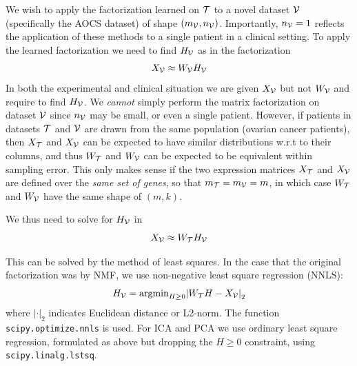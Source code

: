 \documentclass[tikz, 12pt,a4paper,oneside,fleqn]{article}
\begin{document}
We wish to apply the factorization learned on $\mathcal{T}$ to a novel dataset $\mathcal{V}$ (specifically the AOCS dataset) of shape $(m_{\mathcal{V}}, n_{\mathcal{V}})$. 
Importantly, $n_{\mathcal{V}} = 1$ reflects the application of these methods to a single patient in a clinical setting.  To apply the learned factorization we need to find $H_{\mathcal{V}}$ as in the factorization
\begin{equation}
	X_{\mathcal{V}} \approx W_{\mathcal{V}} H_{\mathcal{V}}
\end{equation}
In both the experimental and clinical situation we are given $X_{\mathcal{V}}$ but not $W_{\mathcal{V}}$ and require to find $H_{\mathcal{V}}$. 
We \emph{cannot} simply perform the matrix factorization on dataset $\mathcal{V}$ since $n_{\mathcal{V}}$ may be small, or even a single patient.   
However, if patients in datasets $\mathcal{T}$ and $\mathcal{V}$ are drawn from the same population (ovarian cancer patients), then $X_{\mathcal{T}}$ and $X_{\mathcal{V}}$ can be expected to have similar distributions w.r.t to their columns, and thus $W_{\mathcal{T}}$ and $W_{\mathcal{V}}$ can be expected to be equivalent within sampling error.  
This only makes sense if the two expression matrices $X_{\mathcal{T}}$ and $X_{\mathcal{V}}$ are defined over the \emph{same set of genes}, so that $m_{\mathcal{T}} = m_{\mathcal{V}} = m$, in which case $W_{\mathcal{T}}$ and $W_{\mathcal{V}}$ have the same shape of $(m, k)$.   

We thus need to solve for $H_{\mathcal{V}}$ in
\begin{equation}
	X_{\mathcal{V}}  \approx  W_{\mathcal{T}} H_{\mathcal{V}} \label{eq_Xv_WtHv}
\end{equation}

This can be solved by the method of least squares.  In the case that the original factorization was by NMF, we use non-negative least square regression (NNLS):
\begin{equation}
	H_{\mathcal{V}} = \mbox{argmin}_{H\geq 0}{\lvert W_{\mathcal{T}} H - X_{\mathcal{V}} \rvert}_2
	\label{eq_Hv_WdtXv}
\end{equation}
where ${\lvert \mathbf{\cdot} \rvert}_2$ indicates Euclidean distance or L2-norm.
The function {\tt scipy.optimize.nnls} is used.
For ICA and PCA we use ordinary least square regression, formulated as above but dropping the $H\geq 0$ constraint, using {\tt scipy.linalg.lstsq}.

\end{document}
